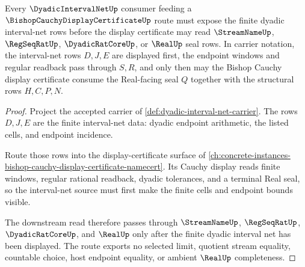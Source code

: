 \begin{theorem}
\label{thm:dyadic-interval-net-bishop-cauchy-display-route}
Every $\DyadicIntervalNetUp$ consumer feeding a $\BishopCauchyDisplayCertificateUp$ route must expose the finite dyadic interval-net rows before the display certificate may read $\StreamNameUp$, $\RegSeqRatUp$, $\DyadicRatCoreUp$, or $\RealUp$ seal rows. In carrier notation, the interval-net rows $D,J,E$ are displayed first, the endpoint windows and regular readback pass through $S,R$, and only then may the Bishop Cauchy display certificate consume the Real-facing seal $Q$ together with the structural rows $H,C,P,N$.
\end{theorem}
\begin{proof}
Project the accepted carrier of \autoref{def:dyadic-interval-net-carrier}. The rows $D,J,E$ are the finite interval-net data: dyadic endpoint arithmetic, the listed cells, and endpoint incidence.

Route those rows into the display-certificate surface of \autoref{ch:concrete-instances-bishop-cauchy-display-certificate-namecert}. Its Cauchy display reads finite windows, regular rational readback, dyadic tolerances, and a terminal Real seal, so the interval-net source must first make the finite cells and endpoint bounds visible.

The downstream read therefore passes through $\StreamNameUp$, $\RegSeqRatUp$, $\DyadicRatCoreUp$, and $\RealUp$ only after the finite dyadic interval net has been displayed. The route exports no selected limit, quotient stream equality, countable choice, host endpoint equality, or ambient $\RealUp$ completeness.
\end{proof}
